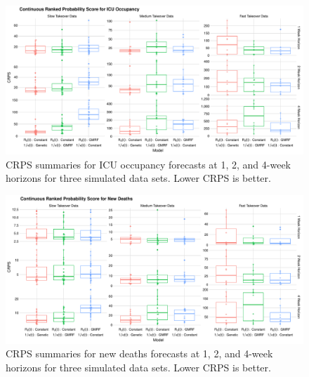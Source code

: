 \begin{figure}
    \centering
    \includegraphics[width=1.0\columnwidth]{simulated_crps_comparison_boxplot_data_icu_plot}
    \caption{CRPS summaries for ICU occupancy forecasts at 1, 2, and 4-week horizons for three simulated data sets. Lower CRPS is better.}
    \label{ch_5:fig:simulated_crps_comparison_boxplot_data_icu_plot}
\end{figure}

\begin{figure}
    \centering
    \includegraphics[width=1.0\columnwidth]{simulated_crps_comparison_boxplot_data_new_deaths_plot}
    \caption{CRPS summaries for new deaths forecasts at 1, 2, and 4-week horizons for three simulated data sets. Lower CRPS is better.}
    \label{ch_5:fig:simulated_crps_comparison_boxplot_data_new_deaths_plot}
\end{figure}

